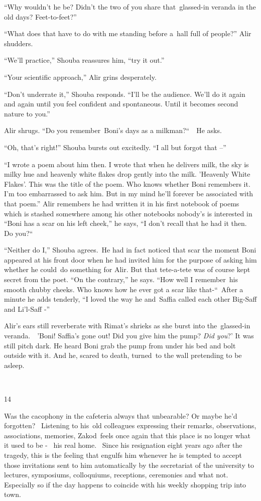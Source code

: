 \documentclass[twoside,11pt]{book}
\begin{document}
``Why wouldn't he be? Didn't the two of you share that\ glassed-in veranda in the old days?
Feet-to-feet?''

``What does that have to do with me standing before a~hall full of people?'' Alir shudders. 

``We'll practice,'' Shouba reassures him, ``try it out.'' 

``Your scientific approach,'' Alir grins desperately. 

``Don't underrate it,'' Shouba responds. ``I'll be the audience. We'll do it
again and again until you feel confident and spontaneous. Until it becomes second nature to you.'' 

Alir shrugs. ``Do you remember~Boni's days as a milkman?``\ \ He asks. 

``Oh, that's right!'' Shouba bursts out excitedly. ``I all but forgot that
--''

``I wrote a poem about him then. I wrote that when he delivers milk, the sky is milky hue and heavenly
white flakes drop gently into the milk. 'Heavenly White Flakes'. This was the title of the poem. Who knows whether Boni
remembers it. I'm too embarrassed to ask him. But in my mind he'll forever be associated with that poem.''
Alir remembers he had written it in his first notebook of poems which is stashed somewhere among his other notebooks
nobody's is interested in ``Boni has a scar on his left cheek,'' he says, ``I
don't recall that he had it then. Do you?``\ \ 

``Neither do I,'' Shouba agrees.\  He had in fact noticed that scar the moment Boni appeared
at his front door when he had invited him for the purpose of asking him whether he could\ do something for Alir. But
that tete-a-tete was of course kept secret from the poet. ``On the contrary,'' he says.
``How well I remember~his smooth chubby cheeks. Who knows how he ever got a scar like
that{}-``\ After a minute he adds tenderly, ``I loved the way he and~Saffia called each other
Big-Saff and Li'l-Saff -''

Alir's ears still reverberate with Rimat's shrieks as she burst into the\ glassed-in veranda.\ \ {}'Boni! Saffia's gone
out! Did you give him the pump? \textit{Did you}?' It was still pitch dark. He heard Boni grab the pump from under his
bed and bolt outside with it. And he, scared to death, turned~to the wall pretending to be asleep.

~

14 

Was the cacophony in the cafeteria always that unbearable? Or maybe he'd forgotten? ~Listening to his~old colleagues
expressing their remarks, observations, associations, memories, Zakod~feels once again that this place is no longer
what it used to be -~ his real home. ~Since his resignation eight years ago after the tragedy, this is the feeling that
engulfs him whenever he is tempted to accept those invitations sent to him automatically by the secretariat of the
university to lectures, symposiums, colloquiums, receptions, ceremonies and what not. Especially so if the day happens
to coincide with his weekly shopping trip into town. 
\end{document}
